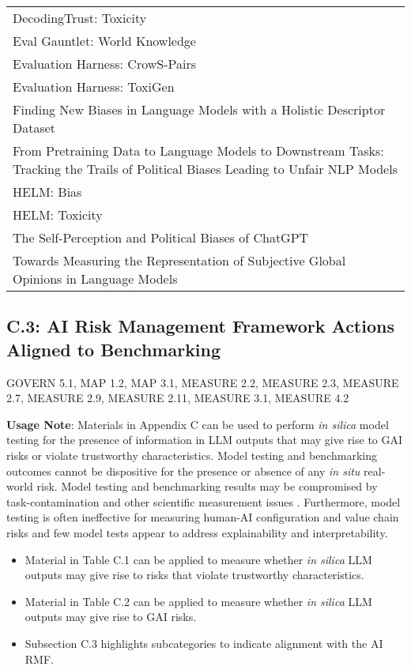 \documentclass[fleqn]{article}
\begin{document}
\begin{table}[H]
\begin{tabular}{l}
		DecodingTrust: Toxicity \\
		Eval Gauntlet: World Knowledge \\
		Evaluation Harness: CrowS-Pairs  \\
		Evaluation Harness: ToxiGen \\
		Finding New Biases in Language Models with a Holistic Descriptor Dataset \\
		\makecell[l]{From Pretraining Data to Language Models to Downstream Tasks:\\\hspace{10pt} Tracking the Trails of Political Biases Leading to Unfair NLP Models} \\
		HELM: Bias \\
		HELM: Toxicity \\
		The Self-Perception and Political Biases of ChatGPT \\
		Towards Measuring the Representation of Subjective Global Opinions in Language Models\\
		\bottomrule			
	\end{tabular}
\end{table}

\subsection*{C.3: AI Risk Management Framework Actions Aligned to Benchmarking}\label{appndxc3}

GOVERN 5.1, MAP 1.2, MAP 3.1, MEASURE 2.2, MEASURE 2.3, MEASURE 2.7, MEASURE 2.9, MEASURE 2.11, MEASURE 3.1, MEASURE 4.2

\pagebreak

\noindent \textbf{Usage Note}: Materials in Appendix C can be used to perform \textit{in silica} model testing for the presence of information in LLM outputs that may give rise to GAI risks or violate trustworthy characteristics. Model testing and benchmarking outcomes cannot be dispositive for the presence or absence of any \textit{in situ} real-world risk. Model testing and benchmarking results may be compromised by task-contamination and other scientific measurement issues \cite{balloccu2024leak}. Furthermore, model testing is often ineffective for measuring human-AI configuration and value chain risks and few model tests appear to address explainability and interpretability. 

\begin{itemize}
	\item Material in Table C.1 can be applied to measure whether \textit{in silica} LLM outputs may give rise to risks that violate trustworthy characteristics.
	\item Material in Table C.2 can be applied to measure whether \textit{in silica} LLM outputs may give rise to GAI risks.
	\item Subsection C.3 highlights subcategories to indicate alignment with the AI RMF.   
\end{itemize}
\end{document}
